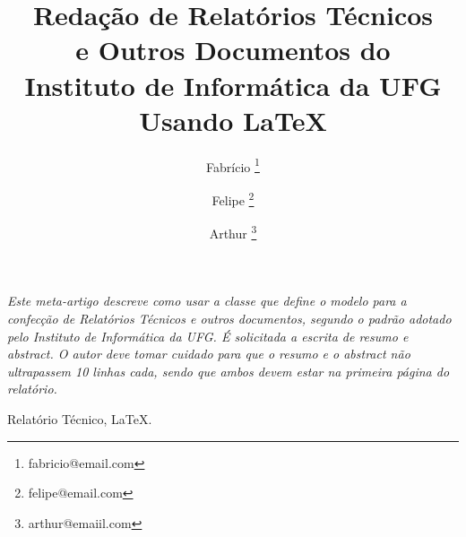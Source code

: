 \documentclass[a4paper, 12pt]{article}
\makeatletter
\newenvironment{resumo}{%
  \list{}{%
    \leftmargin=0.8cm
    \labelwidth=\z@
    \listparindent=\z@
    \itemindent\listparindent
    \rightmargin\leftmargin}\item[\hskip\labelsep
  \bfseries\itshape Resumo.]\itshape}%
{\endlist}
\newenvironment{palavras-chave}{%
  \list{}{%
    \leftmargin=0.8cm
    \labelwidth=\z@
    \listparindent=\z@
    \itemindent\listparindent
    \rightmargin\leftmargin}\item[\hskip\labelsep
  \bfseries Palavras-Chave:]}%
{\endlist}
\makeatother
\begin{document}
%
\title{\bf Redação de Relatórios Técnicos \\e Outros Documentos do
  \\ Instituto de Informática da UFG Usando \LaTeX}

\author{Fabrício \thanks{fabricio@email.com} \and
  Felipe \thanks{felipe@email.com} \and
  Arthur \thanks{arthur@emaiil.com}}
\date{}

\maketitle






\begin{resumo} 
Este meta-artigo descreve como usar a classe que define o modelo para a confecção de Relatórios Técnicos e outros documentos, segundo o padrão adotado pelo Instituto de Informática da UFG. É solicitada a escrita de resumo e \textit{abstract}. O autor deve tomar cuidado para que o resumo e o \textit{abstract} não ultrapassem 10 linhas cada, sendo que ambos devem estar na primeira página do relatório.
\end{resumo}

\begin{palavras-chave}
Relatório Técnico, \LaTeX.
\end{palavras-chave}









% 
\end{document}

